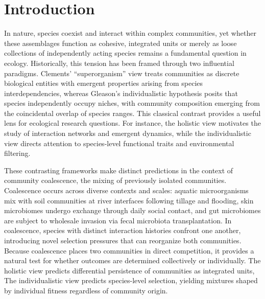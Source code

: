 \section{Introduction}
\label{sec:introduction}

In nature, species coexist and interact within complex communities, yet whether these assemblages function as cohesive, integrated units or merely as loose collections of independently acting species remains a fundamental question in ecology. Historically, this tension has been framed through two influential paradigms. Clements’ “superorganism” view treats communities as discrete biological entities with emergent properties arising from species interdependencies\citep{Clements1916, WilsonSober1989}, whereas Gleason’s individualistic hypothesis posits that species independently occupy niches, with community composition emerging from the coincidental overlap of species ranges\citep{Gleason1926}. This classical contrast provides a useful lens for ecological research questions. For instance, the holistic view motivates the study of interaction networks and emergent dynamics\citep{Dunne2002, Allison2008}, while the individualistic view directs attention to species-level functional traits and environmental filtering\citep{Keddy1992, McGill2006}. 

These contrasting frameworks make distinct predictions in the context of community coalescence, the mixing of previously isolated communities\citep{Rillig2015, Lechon2021}. Coalescence occurs across diverse contexts and scales: aquatic microorganisms mix with soil communities at river interfaces following tillage and flooding\citep{Liu2024, Huet2023}, skin microbiomes undergo exchange through daily social contact\citep{Xiao2020}, and gut microbiomes are subject to wholesale invasion via fecal microbiota transplantation\citep{Gupta2021}. In coalescence, species with distinct interaction histories confront one another, introducing novel selection pressures that can reorganize both communities\citep{Rillig2015}. Because coalescence places two communities in direct competition, it provides a natural test for whether outcomes are determined collectively or individually. The holistic view predicts differential persistence of communities as integrated units,  The individualistic view predicts species-level selection, yielding mixtures shaped by individual fitness regardless of community origin.

